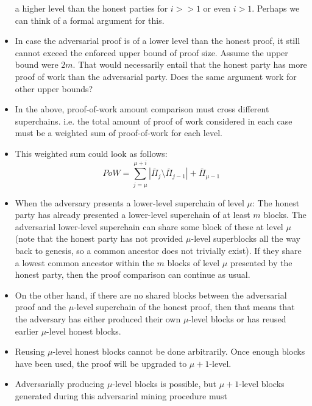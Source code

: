 \begin{itemize}
        a higher level than the honest parties for $i >> 1$ or even $i > 1$.
        Perhaps we can think of a formal argument for this.
    \item
        In case the adversarial proof is of a lower level than the honest
        proof, it still cannot exceed the enforced upper bound of proof size.
        Assume the upper bound were $2m$. That would necessarily entail that
        the honest party has more proof of work than the adversarial party.
        Does the same argument work for other upper bounds?
    \item
        In the above, proof-of-work amount comparison must cross different
        superchains. i.e. the total amount of proof of work considered in each
        case must be a weighted sum of proof-of-work for each level.
    \item
        This weighted sum could look as follows:
        \begin{equation}
            PoW =
            \sum_{j = \mu}^{\mu + i}
            {|\overline{\Pi}_j \setminus \overline{\Pi}_{j - 1}|}
            + \overline{\Pi}_{\mu - 1}
        \end{equation}
    \item
        When the adversary presents a lower-level superchain of level $\mu$:
        The honest party has already presented a lower-level superchain of at
        least $m$ blocks. The adversarial lower-level superchain can share some
        block of these at level $\mu$ (note that the honest party has not
        provided $\mu$-level superblocks all the way back to genesis, so a
        common ancestor does not trivially exist). If they share a lowest
        common ancestor within the $m$ blocks of level $\mu$ presented by the
        honest party, then the proof comparison can continue as usual.
    \item
        On the other hand, if there are no shared blocks between the
        adversarial proof and the $\mu$-level superchain of the honest proof,
        then that means that the adversary has either produced their own
        $\mu$-level blocks or has reused earlier $\mu$-level honest blocks.
    \item
        Reusing $\mu$-level honest blocks cannot be done arbitrarily. Once
        enough blocks have been used, the proof will be upgraded to $\mu +
        1$-level.
    \item
        Adversarially producing $\mu$-level blocks is possible, but $\mu +
        1$-level blocks generated during this adversarial mining procedure must

\end{itemize}

